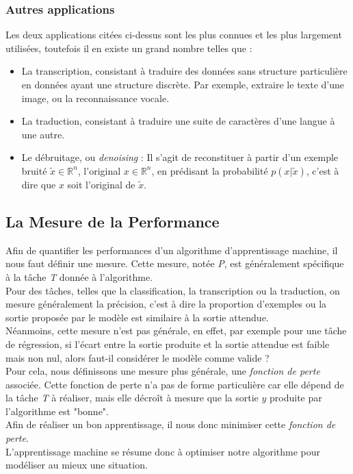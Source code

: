 \documentclass[10pt,a4paper]{report}
\begin{document}
			\subsubsection{Autres applications}
			Les deux applications citées ci-dessus sont les plus connues et les plus largement utilisées, toutefois il en existe un grand nombre telles que :
			\begin{itemize}
				\item La transcription, consistant à traduire des données sans structure particulière en données ayant une structure discrète. Par exemple, extraire le texte d'une image, ou la reconnaissance vocale.
				\item La traduction, consistant à traduire une suite de caractères d'une langue à une autre.
				\item Le débruitage, ou \emph{denoising} : Il s'agit de reconstituer à partir d'un exemple bruité $\tilde{x} \in \mathbb{R}^n$, l'original $x \in \mathbb{R}^n$, en prédisant la probabilité $p(x|\tilde{x})$, c'est à dire que $x$ soit l'original de $\tilde{x}$.
			\end{itemize}
		
		\subsection{La Mesure de la Performance}
		Afin de quantifier les performances d'un algorithme d'apprentissage machine, il nous faut définir une mesure. Cette mesure, notée \emph{P}, est généralement spécifique à la tâche \emph{T} donnée à l'algorithme.\\
		Pour des tâches, telles que la classification, la transcription ou la traduction, on mesure généralement la précision, c'est à dire la proportion d'exemples ou la sortie proposée par le modèle est similaire à la sortie attendue.\\
		Néanmoins, cette mesure n'est pas générale, en effet, par exemple pour une tâche de régression, si l'écart entre la sortie produite et la sortie attendue est faible mais non nul, alors faut-il considérer le modèle comme valide ?\\
		Pour cela, nous définissons une mesure plus générale, une \emph{fonction de perte }associée.
		Cette fonction de perte n'a pas de forme particulière car elle dépend de la tâche \emph{T} à réaliser, mais elle décroît à mesure que la sortie $y$ produite par l'algorithme est "bonne".\\
		Afin de réaliser un bon apprentissage, il nous donc minimiser cette \emph{fonction de perte}.\\
		L'apprentissage machine se résume donc à optimiser notre algorithme pour modéliser au mieux une situation.
		
\end{document}
